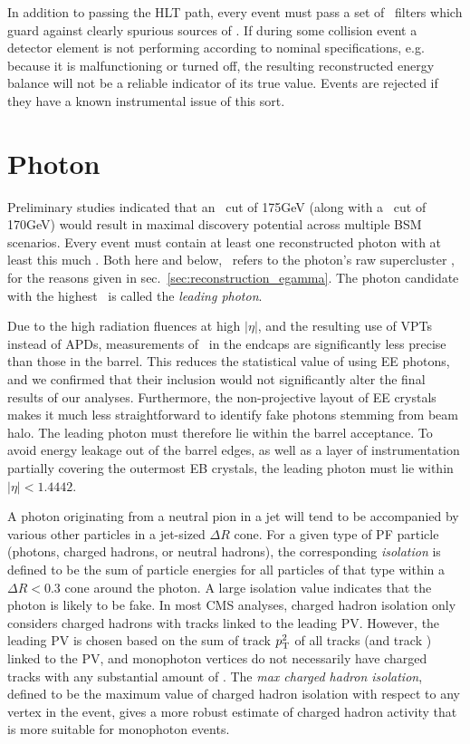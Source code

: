In addition to passing the HLT path, every event must pass a set of \MET\ filters which guard against clearly spurious sources of \MET. If during some collision event
a detector element is not performing according to nominal specifications, e.g. because it is malfunctioning or turned off, the resulting reconstructed energy balance will
not be a reliable indicator of its true value. Events are rejected if they have a known instrumental issue of this sort.

\section{Photon} \label{sec:event_selection_photon}
Preliminary studies indicated that an \ETgamma\ cut of 175\unit{GeV} (along with a \MET\ cut of 170\unit{GeV}) would result in maximal discovery potential across
multiple BSM scenarios. Every event must contain at least one reconstructed photon with at least this much \ETgamma. Both here and below,
\ETgamma\ refers to the photon's raw supercluster \ET, for the reasons given in sec.~\ref{sec:reconstruction_egamma}. The photon candidate with the highest
\ETgamma\ is called the \textit{leading photon}.

Due to the high radiation fluences at high $|\eta|$, and the resulting use of VPTs instead of APDs, measurements of \ETgamma\ in the endcaps are significantly less precise
than those in the barrel. This reduces the statistical value of using EE photons, and we confirmed that their inclusion would not significantly alter the final results
of our analyses. Furthermore, the non-projective layout of EE crystals makes it much less straightforward to identify fake photons stemming from beam halo.
The leading photon must therefore lie within the barrel acceptance. To avoid energy leakage out of the barrel edges, as well as a layer of instrumentation partially
covering the outermost EB crystals, the leading photon must lie within $|\eta| < 1.4442$.

A photon originating from a neutral pion in a jet will tend to be accompanied by various other particles in a jet-sized $\Delta R$ cone. For a given type of PF particle
(photons, charged hadrons, or neutral hadrons), the corresponding \textit{isolation} is defined to be the sum of particle energies for all particles of that type
within a $\Delta R < 0.3$ cone around the photon. A large isolation value indicates that the photon is likely to be fake.
In most CMS analyses, charged hadron isolation only considers charged hadrons with tracks linked to the leading PV. However,
the leading PV is chosen based on the sum of track $p_\mathrm{T}^{2}$ of all tracks (and track \MET) linked to the PV, and monophoton vertices do not necessarily have charged tracks
with any substantial amount of \pT. The \textit{max charged hadron isolation}, defined to be the maximum value of charged hadron isolation with respect to any vertex in the event,
gives a more robust estimate of charged hadron activity that is more suitable for monophoton events.

